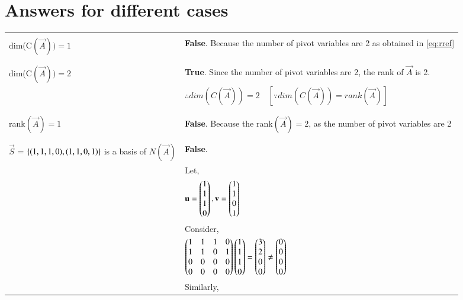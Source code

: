 \documentclass[journal,12pt,twocolumn]{IEEEtran}
\newcommand\myemptypage{
	\null
	\thispagestyle{empty}
	\addtocounter{page}{-1}
	\newpage
}
\begin{document}
\section{Answers for different cases}
\pagebreak
\myemptypage
\begin{table}[h]
	\begin{tabular}{|m{4.5cm}|l|}
		\hline
		&\\
		dim(C$(\vec{A})) = 1$ 
		& \textbf{False}. Because the number of pivot variables are 2 as obtained in \eqref{eq:rref}\\
		&\\
		\hline
		&\\
		dim(C$(\vec{A})) = 2$
		& \textbf{True}. Since the number of pivot variables are 2, the rank of $\vec{A}$ is 2.\\
		&$\therefore dim(C(\vec{A})) = 2 \quad [\because dim(C(\vec{A})) = rank(\vec{A})]$ \\
		&\\
		\hline
		&\\
	     rank$(\vec{A}) = 1$
		& \textbf{False}. Because the rank$(\vec{A}) = 2$, as the number of pivot variables are 2\\
		&\\
		\hline
		&\\
		$\vec{S}$ = $\left\{(1, 1, 1, 0), (1, 1, 0, 1)\right\}$ is a basis of $N(\vec{A})$
		& \textbf{False}. \\
		& Let, \\
		&  $\mathbf{u} = \begin{pmatrix}1\\1\\1\\0\end{pmatrix}, \mathbf{v} = \begin{pmatrix}1\\1\\0\\1\end{pmatrix}$\\ 
		&Consider, \\
		&$\begin{pmatrix}1 & 1 & 1 & 0 \\ 1 & 1 & 0 & 1\\ 0 & 0 & 0 & 0\\0 & 0 & 0 & 0\end{pmatrix}\begin{pmatrix}1\\1\\1\\0\end{pmatrix} = \begin{pmatrix}3\\2\\0\\0\end{pmatrix} \not = \begin{pmatrix}0\\0\\0\\0\end{pmatrix}$\\
		& Similarly,\\

\end{tabular}
\end{table}
\end{document}
